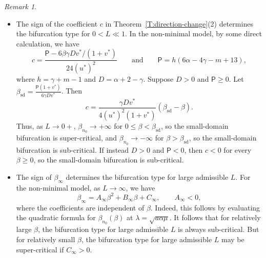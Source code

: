 \documentclass[11pt]{article} %
\theoremstyle{remark}
\newtheorem{remark}{Remark}[section]
\theoremstyle{remark}
\numberwithin{equation}{section}
\numberwithin{figure}{section}
\numberwithin{table}{section}
\begin{document}
\begin{remark}
\begin{itemize}
    \item[-] The sign of the coefficient $c$ in
      Theorem~\ref{T:direction-change}(2) determines the bifurcation type for $0
      < L\ll 1$. In the non-minimal model, by some direct calculation, we have
      \begin{equation}\label{E:c-constant}
        c=\frac{\mathsf{P}-6\beta\gamma Dv^*/(1+v^*)}{24(u^*)^2}
        \qquad \text{and} \qquad \mathsf{P}=h(6\alpha-4\gamma-m+13),
      \end{equation}
      where $h = \gamma + m - 1$ and $D = \alpha + 2 - \gamma$. Suppose $D > 0$
      and $\mathsf{P} \ge 0$. Let $\beta_{\mathrm{sd}} =
      \frac{\mathsf{P}(1+v^*)}{6\gamma Dv^*}$.
      Then
      \begin{equation}\label{E:c-sd-factored}
        c=\frac{\gamma Dv^*}{4(u^*)^2(1+v^*)}(\beta_{\mathrm{sd}}-\beta).
      \end{equation}
      Thus, as $L \to 0+$, $\beta_{n_0} \to + \infty$ for $0 \le \beta <
      \beta_{\mathrm{sd}}$, so the small-domain bifurcation is super-critical,
      and $\beta_{n_0} \to - \infty$ for $\beta > \beta_{\mathrm{sd}}$, so the
      small-domain bifurcation is sub-critical. If instead $D > 0$ and
      $\mathsf{P} < 0$, then $c < 0$ for every $\beta \ge 0$, so the
      small-domain bifurcation is sub-critical.

    \item[-] The sign of $\beta_\infty$ determines the bifurcation type for
      large admissible $L$. For the non-minimal model, as $L \to \infty$, we
      have
      \[
        \beta_\infty
        =A_\infty\beta^2+B_\infty\beta+C_\infty,
        \qquad A_\infty<0,
      \]
      where the coefficients are independent of $\beta$. Indeed, this follows by
      evaluating the quadratic formula for $\beta_{n_0}(\beta)$ at $\lambda =
      \sqrt{a\alpha\mu}$. It follows that for relatively large $\beta$, the
      bifurcation type for large admissible $L$ is always sub-critical. But for
      relatively small $\beta$, the bifurcation type for large admissible $L$
      may be super-critical if $C_\infty > 0$.
  \end{itemize}
\end{remark}
\end{document}
